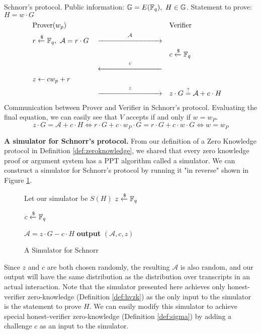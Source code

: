 \begin{protocol}[label={prot:schnorr}]{Schnorr's protocol. Public information: $\mathbb{G} = E(\mathbb{F}_q),\ H \in \mathbb{G}$. Statement to prove: $H = w \cdot G$} 
    \vspace{-0.5cm}
    \begin{align*}
        &\text{Prover}(w_p)& 
        &&
        &\text{Verifier}& 
        \\
        &r \samplefrom \F_q,\ \mathcal A = r \cdot G&
        &\overset  {\mathcal A} {\xrightarrow{\hspace{3cm}}}&
        && 
        \\
        &&
        &&
        &c \samplefrom \F_q&
        \\
        &&
        &\overset c {\xleftarrow{\hspace{3cm}}}&
        &&
        \\
        &z \leftarrow cw_p + r&
        &&
        && 
        \\
        &&
        &\overset {z} {\xrightarrow{\hspace{3cm}}}&
        &z \cdot G \verify \mathcal A + c \cdot H&
    \end{align*}
    \tcblower
    Communication between Prover and Verifier in Schnorr's protocol. Evaluating the final equation, we can easily see that $V$ accepts if and only if $w = w_P$.
    \[
    z \cdot G = \mathcal A + c \cdot H \iff
    r \cdot G + c \cdot w_P \cdot G  = r \cdot G + c \cdot w \cdot G \iff
    w  =  w_P
    \]
\end{protocol}



\textbf{A simulator for Schnorr's protocol.} From our definition of a Zero Knowledge protocol in Definition 
\ref{def:zeroknowledge}, we shared that every zero knowledge proof or argument system has a PPT algorithm called a simulator. 
We can construct a simulator for Schnorr's protocol by running it "in reverse" shown in Figure \ref{fig:schnorr-sim}.

\begin{figure}[h]
    \centering
    \begin{problem}[width=\linewidth/2]{Let our simulator be $S(H)$}
        $z \xleftarrow{\$} \mathbb{F}_q$ 
        
        $c \xleftarrow{\$} \mathbb{F}_q$
        
        $\mathcal A = z \cdot G - c \cdot H$
        \tcblower
        \textbf{output} $(\mathcal A,c,z)$
    \end{problem}
    \caption{A Simulator for Schnorr}
    \label{fig:schnorr-sim}
\end{figure}

Since $z$ and $c$ are both chosen randomly, the resulting $\mathcal A$ is also random, and our 
output will have the same distribution as the distribution over transcripts in an actual interaction.
Note that the simulator presented here achieves only honest-verifier zero-knowledge (Definition
\ref{def:hvzk}) as the only input to the simulator is the statement to prove $H$. We can 
easily modify this simulator to achieve special honest-verifier zero-knowledge (Definition 
\ref{def:sigma}) by adding a challenge $c$ as an input to the simulator.

